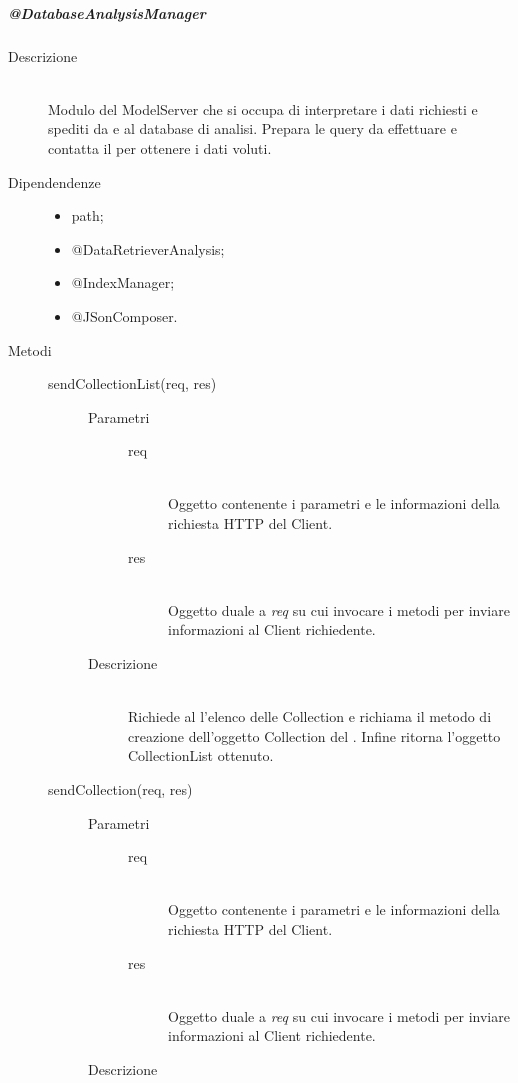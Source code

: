 \subparagraph{@DatabaseAnalysisManager}
\begin{description}
 \item[Descrizione] \hfill \\
Modulo del ModelServer che si occupa di interpretare i dati richiesti e spediti da e al database di analisi. 
Prepara le query da effettuare e contatta il  per ottenere i dati voluti.
 \item[Dipendendenze] \hfill
 \begin{itemize}
  \item path;
  \item @DataRetrieverAnalysis;
  \item @IndexManager;
  \item @JSonComposer.
 \end{itemize}
 
 
 \item[Metodi] \hfill
 \begin{description}
 \item[sendCollectionList(req, res)] \hfill 
 \begin{description}
 \item[Parametri] \hfill
  \begin{description}
   \item[req] \hfill \\
   Oggetto contenente i parametri e le informazioni della richiesta HTTP del Client.
   \item[res] \hfill \\
   Oggetto duale a \textit{req} su cui invocare i metodi per inviare informazioni al Client richiedente.
  \end{description}
 \item[Descrizione] \hfill \\
 Richiede al  l'elenco delle Collection e richiama il metodo di creazione dell'oggetto Collection del . Infine ritorna l'oggetto CollectionList ottenuto.
 \end{description}
 
 \item[sendCollection(req, res)] \hfill 
 \begin{description}
 \item[Parametri] \hfill
  \begin{description}
   \item[req] \hfill \\
   Oggetto contenente i parametri e le informazioni della richiesta HTTP del Client.
   \item[res] \hfill \\
   Oggetto duale a \textit{req} su cui invocare i metodi per inviare informazioni al Client richiedente.
  \end{description}
 \item[Descrizione] \hfill \\


\end{description}
\end{description}
\end{description}
